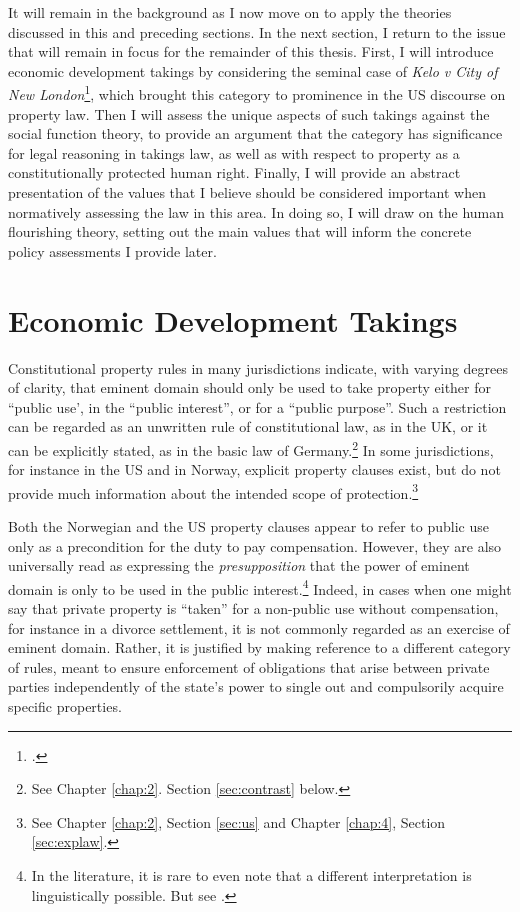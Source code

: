 It will remain in the background as I now move on to apply the theories discussed in this and preceding sections. In the next section,  I return to the issue that will remain in focus for the remainder of this thesis. First, I will introduce economic development takings by considering the seminal case of {\it Kelo v City of New London}\footcite{kelo05}, which brought this category to prominence in the US discourse on property law. Then I will assess the unique aspects of such takings against the social function theory, to provide an argument that the category has significance for legal reasoning in takings law, as well as with respect to property as a constitutionally protected human right. Finally, I will provide an abstract presentation of the values that I believe should be considered important when normatively assessing the law in this area. In doing so, I will draw on the human flourishing theory, setting out the main values that will inform the concrete policy assessments I provide later. 

\section{Economic Development Takings}\label{sec:edt}

Constitutional property rules in many jurisdictions indicate, with varying degrees of clarity, that eminent domain should only be used to take property either for ``public use', in the ``public interest'', or for a ``public purpose''. Such a restriction can be regarded as an unwritten rule of constitutional law, as in the UK, or it can be explicitly stated, as in the basic law of Germany.\footnote{See Chapter \ref{chap:2}. Section \ref{sec:contrast} below.} In some jurisdictions, for instance in the US and in Norway, explicit property clauses exist, but do not provide much information about the intended scope of protection.\footnote{See Chapter \ref{chap:2}, Section \ref{sec:us} and Chapter \ref{chap:4}, Section \ref{sec:explaw}.}

Both the Norwegian and the US property clauses appear to refer to public use only as a precondition for the duty to pay compensation. However, they are also universally read as expressing the {\it presupposition} that the power of eminent domain is only to be used in the public interest.\footnote{In the literature, it is rare to even note that a different interpretation is linguistically possible. But see \cite[205]{berger78}.} Indeed, in cases when one might say that private property is ``taken'' for a non-public use without compensation, for instance in a divorce settlement, it is not commonly regarded as an exercise of eminent domain. Rather, it is justified by making reference to a different category of rules, meant to ensure enforcement of obligations that arise between private parties independently of the state's power to single out and compulsorily acquire specific properties.

